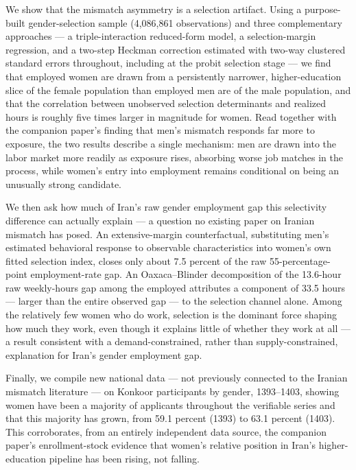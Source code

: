 \documentclass[11pt]{article}
\begin{document}
We show that the mismatch asymmetry is a selection artifact. Using a purpose-built gender-selection sample (4{,}086{,}861 observations) and three complementary approaches --- a triple-interaction reduced-form model, a selection-margin regression, and a two-step Heckman correction estimated with two-way clustered standard errors throughout, including at the probit selection stage --- we find that employed women are drawn from a persistently narrower, higher-education slice of the female population than employed men are of the male population, and that the correlation between unobserved selection determinants and realized hours is roughly five times larger in magnitude for women. Read together with the companion paper's finding that men's mismatch responds far more to exposure, the two results describe a single mechanism: men are drawn into the labor market more readily as exposure rises, absorbing worse job matches in the process, while women's entry into employment remains conditional on being an unusually strong candidate.

We then ask how much of Iran's raw gender employment gap this selectivity difference can actually explain --- a question no existing paper on Iranian mismatch has posed. An extensive-margin counterfactual, substituting men's estimated behavioral response to observable characteristics into women's own fitted selection index, closes only about 7.5 percent of the raw 55-percentage-point employment-rate gap. An Oaxaca--Blinder decomposition of the 13.6-hour raw weekly-hours gap among the employed attributes a component of 33.5 hours --- larger than the entire observed gap --- to the selection channel alone. Among the relatively few women who do work, selection is the dominant force shaping how much they work, even though it explains little of whether they work at all --- a result consistent with a demand-constrained, rather than supply-constrained, explanation for Iran's gender employment gap.

Finally, we compile new national data --- not previously connected to the Iranian mismatch literature --- on Konkoor participants by gender, 1393--1403, showing women have been a majority of applicants throughout the verifiable series and that this majority has grown, from 59.1 percent (1393) to 63.1 percent (1403). This corroborates, from an entirely independent data source, the companion paper's enrollment-stock evidence that women's relative position in Iran's higher-education pipeline has been rising, not falling.
\end{document}
